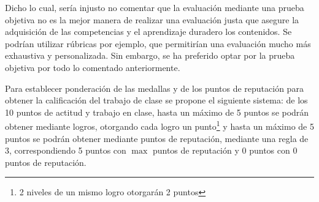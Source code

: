 Dicho lo cual, sería injusto no comentar que la evaluación mediante una prueba objetiva no es la mejor manera de realizar una evaluación justa que asegure la adquisición de las competencias y el aprendizaje duradero los contenidos.
%
Se podrían utilizar rúbricas por ejemplo, que permitirían una evaluación mucho más exhaustiva y personalizada.
%
Sin embargo, se ha preferido optar por la prueba objetiva por todo lo comentado anteriormente.


Para establecer ponderación de las medallas y de los puntos de reputación para obtener la calificación del trabajo de clase se propone el siguiente sistema:
%
de los 10 puntos de actitud y trabajo en clase, hasta un máximo de 5 puntos se podrán obtener mediante logros, otorgando cada logro un punto\footnote{2 niveles de un mismo logro otorgarán 2 puntos} y hasta un máximo de 5 puntos se podrán obtener mediante puntos de reputación, mediante una regla de 3, correspondiendo 5 puntos con $\max$ puntos de reputación y 0 puntos con 0 puntos de reputación.







